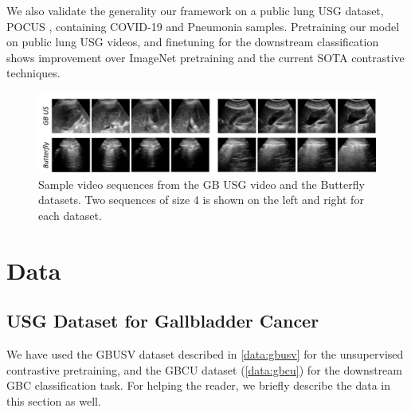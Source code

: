 We also validate the generality our framework on a public lung USG dataset, POCUS \cite{pocus}, containing COVID-19 and Pneumonia samples. Pretraining our model on public lung USG videos, and finetuning for the downstream classification shows improvement over ImageNet pretraining and the current SOTA contrastive techniques.


%
\begin{figure}[t]
    \centering
    \includegraphics[width=0.9\linewidth]{figs/usucl/data_sample.png}
    \caption[Sample video sequences for the GBC and Covid Ultrasound data]{Sample video sequences from the GB USG video and the Butterfly \cite{butterfly} datasets. Two sequences of size 4 is shown on the left and right for each dataset.}
    \label{usucl_fig:data_sample}
\end{figure}
%
\section{Data}
%
\subsection{USG Dataset for Gallbladder Cancer}
%
We have used the GBUSV dataset described in \cref{data:gbusv} for the unsupervised contrastive pretraining, and the GBCU dataset (\cref{data:gbcu}) for the downstream GBC classification task. For helping the reader, we briefly describe the data in this section as well.

